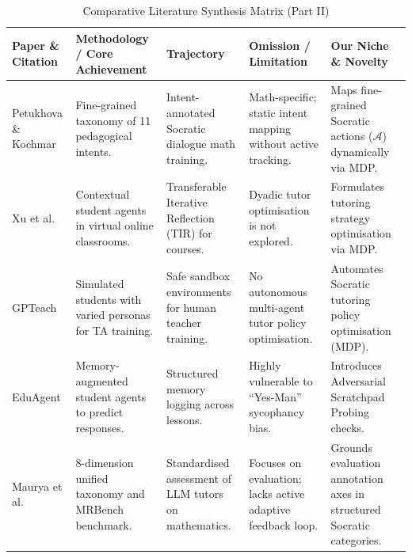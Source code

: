 \begin{table}[htbp]
\centering
\small
\begin{tabularx}{\textwidth}{lYYYY}
\toprule
\textbf{Paper \& Citation} & \textbf{Methodology / Core Achievement} & \textbf{Trajectory} & \textbf{Omission / Limitation} & \textbf{Our Niche \& Novelty} \\
\midrule
Petukhova \& Kochmar \cite{petukhova2025intent} & Fine-grained taxonomy of 11 pedagogical intents. & Intent-annotated Socratic dialogue math training. & Math-specific; static intent mapping without active tracking. & Maps fine-grained Socratic actions ($\mathcal{A}$) dynamically via MDP. \\
\midrule
Xu et al. \cite{xu2025classroom} & Contextual student agents in virtual online classrooms. & Transferable Iterative Reflection (TIR) for courses. & Dyadic tutor optimisation is not explored. & Formulates tutoring strategy optimisation via MDP. \\
\midrule
GPTeach \cite{markel2023gpteach} & Simulated students with varied personas for TA training. & Safe sandbox environments for human teacher training. & No autonomous multi-agent tutor policy optimisation. & Automates Socratic tutoring policy optimisation (MDP). \\
\midrule
EduAgent \cite{xu2024eduagent} & Memory-augmented student agents to predict responses. & Structured memory logging across lessons. & Highly vulnerable to ``Yes-Man'' sycophancy bias. & Introduces Adversarial Scratchpad Probing checks. \\
\midrule
Maurya et al. \cite{maurya2025unifying} & 8-dimension unified taxonomy and MRBench benchmark. & Standardised assessment of LLM tutors on mathematics. & Focuses on evaluation; lacks active adaptive feedback loop. & Grounds evaluation annotation axes in structured Socratic categories. \\
\bottomrule
\end{tabularx}
\caption{Comparative Literature Synthesis Matrix (Part II)}
\label{tab:literature_part2}
\end{table}

